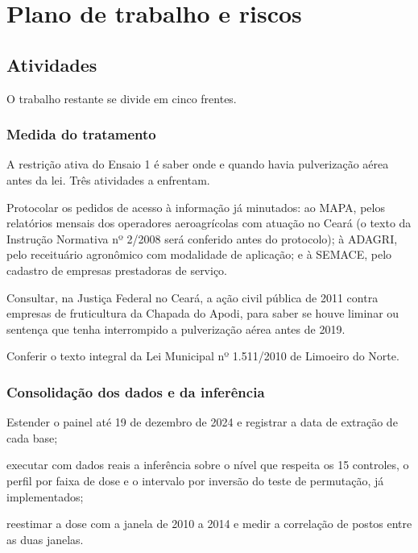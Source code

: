 
\chapter{Plano de trabalho e riscos}
\label{cap:plano}

\section{Atividades}
\label{sec:atividades}

O trabalho restante se divide em cinco frentes.

\subsection{Medida do tratamento}

A restrição ativa do Ensaio 1 é saber onde e quando havia pulverização aérea
antes da lei. Três atividades a enfrentam.

\begin{alineas}
  \item Protocolar os pedidos de acesso à informação já minutados: ao MAPA,
    pelos relatórios mensais dos operadores aeroagrícolas com atuação no Ceará
    (o texto da Instrução Normativa nº 2/2008 será conferido antes do
    protocolo); à ADAGRI, pelo receituário agronômico com modalidade de
    aplicação; e à SEMACE, pelo cadastro de empresas prestadoras de serviço.
  \item Consultar, na Justiça Federal no Ceará, a ação civil pública de 2011
    contra empresas de fruticultura da Chapada do Apodi, para saber se houve
    liminar ou sentença que tenha interrompido a pulverização aérea antes de
    2019.
  \item Conferir o texto integral da Lei Municipal nº 1.511/2010 de Limoeiro do
    Norte.
\end{alineas}

\subsection{Consolidação dos dados e da inferência}

\begin{alineas}
  \item Estender o painel até 19 de dezembro de 2024 e registrar a data de
    extração de cada base;
  \item executar com dados reais a inferência sobre o nível que respeita os 15
    controles, o perfil por faixa de dose e o intervalo por inversão do teste
    de permutação, já implementados;
  \item reestimar a dose com a janela de 2010 a 2014 e medir a correlação de
    postos entre as duas janelas.
\end{alineas}

